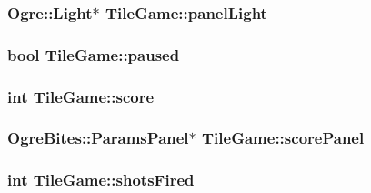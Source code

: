 \hypertarget{classTileGame_a23db72b0263e4d5595c1f170cc312185}{
\subsubsection[{panel\-Light}]{\setlength{\rightskip}{0pt plus 5cm}Ogre\-::\-Light$\ast$ Tile\-Game\-::panel\-Light\hspace{0.3cm}{\ttfamily [protected]}}}\label{classTileGame_a23db72b0263e4d5595c1f170cc312185}
\hypertarget{classTileGame_ac76eb85a5597f84146e49c92f7edc877}{
\subsubsection[{paused}]{\setlength{\rightskip}{0pt plus 5cm}bool Tile\-Game\-::paused\hspace{0.3cm}{\ttfamily [protected]}}}\label{classTileGame_ac76eb85a5597f84146e49c92f7edc877}
\hypertarget{classTileGame_abba0100f7c52d2a9ae1bfa0f5bbee4a5}{
\subsubsection[{score}]{\setlength{\rightskip}{0pt plus 5cm}int Tile\-Game\-::score\hspace{0.3cm}{\ttfamily [protected]}}}\label{classTileGame_abba0100f7c52d2a9ae1bfa0f5bbee4a5}
\hypertarget{classTileGame_a9a4d1b4dfacca55fdeacf454af04fa0c}{
\subsubsection[{score\-Panel}]{\setlength{\rightskip}{0pt plus 5cm}Ogre\-Bites\-::\-Params\-Panel$\ast$ Tile\-Game\-::score\-Panel\hspace{0.3cm}{\ttfamily [protected]}}}\label{classTileGame_a9a4d1b4dfacca55fdeacf454af04fa0c}
\hypertarget{classTileGame_a23df8d17a61584279dbec39ef31092cc}{
\subsubsection[{shots\-Fired}]{\setlength{\rightskip}{0pt plus 5cm}int Tile\-Game\-::shots\-Fired\hspace{0.3cm}{\ttfamily [protected]}}}\label{classTileGame_a23df8d17a61584279dbec39ef31092cc}
